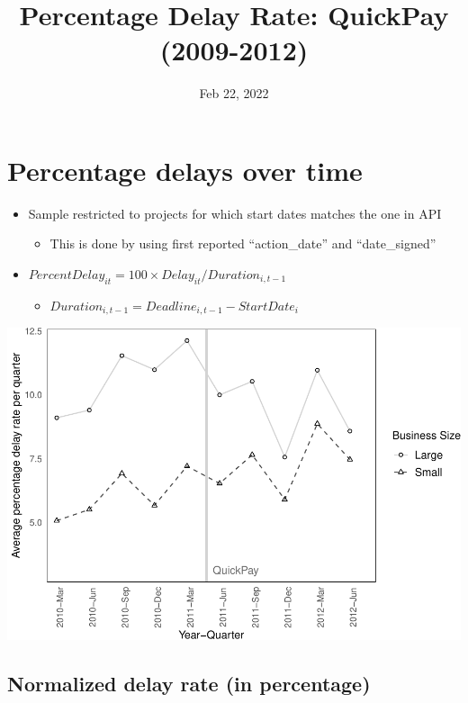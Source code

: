 \documentclass[
]{article}
\title{Percentage Delay Rate: QuickPay (2009-2012)}
\author{}
\date{\vspace{-2.5em}Feb 22, 2022}
\providecommand{\tightlist}{%
  \setlength{\itemsep}{0pt}\setlength{\parskip}{0pt}}
\begin{document}
\maketitle

\hypertarget{percentage-delays-over-time}{%
\section{Percentage delays over
time}\label{percentage-delays-over-time}}

\begin{itemize}
\tightlist
\item
  Sample restricted to projects for which start dates matches the one in
  API

  \begin{itemize}
  \tightlist
  \item
    This is done by using first reported ``action\_date'' and
    ``date\_signed''
  \end{itemize}
\item
  \(PercentDelay_{it}=100 \times Delay_{it}/Duration_{i,t-1}\)

  \begin{itemize}
  \tightlist
  \item
    \(Duration_{i,t-1} = Deadline_{i,t-1} - StartDate_i\)
  \end{itemize}
\end{itemize}

\includegraphics{qp_first_pc_delay-2_files/figure-latex/plot_pc_delay-1.pdf}

\hypertarget{normalized-delay-rate-in-percentage}{%
\subsection{Normalized delay rate (in
percentage)}\label{normalized-delay-rate-in-percentage}}
\end{document}
